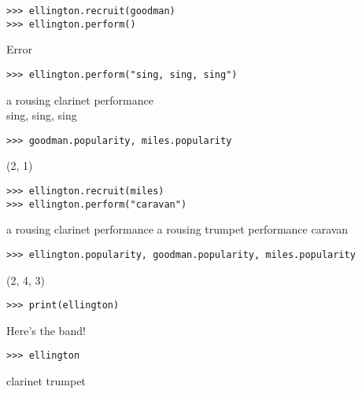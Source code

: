 \vspace*{1in}
\begin{blocksection}
\begin{lstlisting}
>>> ellington.recruit(goodman)
>>> ellington.perform()
\end{lstlisting}
\begin{solution}[.2in]
Error
\end{solution}

\vspace{2\baselineskip}

\begin{lstlisting}
>>> ellington.perform("sing, sing, sing") 
\end{lstlisting}
\begin{solution}[.2in]
a rousing clarinet performance \\
sing, sing, sing
\end{solution}

\vspace{4\baselineskip}

\begin{lstlisting}
>>> goodman.popularity, miles.popularity 
\end{lstlisting}
\begin{solution}[.2in]
(2, 1)
\end{solution}

\vspace{2\baselineskip}

\begin{lstlisting}
>>> ellington.recruit(miles)
>>> ellington.perform("caravan") 
\end{lstlisting}
\begin{solution}[.2in]
a rousing clarinet performance
a rousing trumpet performance
caravan
\end{solution}

\vspace{4\baselineskip}

\begin{lstlisting}
>>> ellington.popularity, goodman.popularity, miles.popularity
\end{lstlisting}
\begin{solution}[.2in]
(2, 4, 3)
\end{solution}

\vspace{2\baselineskip}

\begin{lstlisting}
>>> print(ellington)
\end{lstlisting}
\begin{solution}[.2in]
Here's the band!
\end{solution}

\vspace{2\baselineskip}

\begin{lstlisting}
>>> ellington
\end{lstlisting}
\begin{solution}[.2in]
clarinet trumpet
\end{solution}

\end{blocksection}
